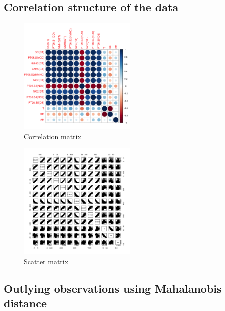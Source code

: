\subsection{Correlation structure of the data}
\begin{figure}[H]
  \centering
  \includegraphics[width=0.5\textwidth]{figs/corr.png}
  \caption{Correlation matrix}
  \label{fig:corr}
\end{figure}

\begin{figure}[H]
  \centering
  \includegraphics[width=0.5\textwidth]{figs/scatter_matrix.png}
  \caption{Scatter matrix}
  \label{fig:scatter_matrix}
\end{figure}

\subsection{Outlying observations using Mahalanobis distance}

